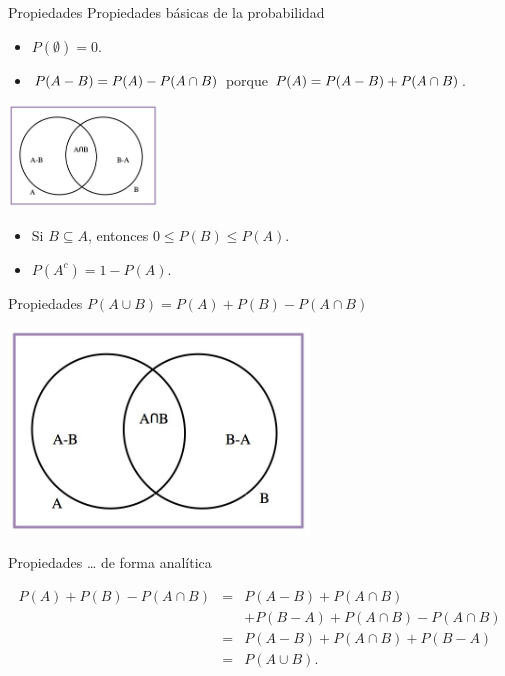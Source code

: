 \documentclass[
  ignorenonframetext,
  aspectratio=169]{beamer}
\begin{document}
\begin{frame}{Propiedades}
\label{propiedades-2}
Propiedades básicas de la probabilidad

\begin{itemize}
\item
  \(P(\emptyset)=0\).
\item
  \(\scriptsize{P(A-B)=P(A)-P(A\cap B)}\) porque
  \(\scriptsize{P(A)=P(A-B)+P(A\cap B)}\).
\end{itemize}

\begin{center}
\includegraphics[width=0.3\textwidth,height=\textheight]{Images/proba1dibujos/A-B.jpg}
\end{center}

\begin{itemize}
\item
  Si \(B\subseteq A\), entonces \(0\leq P(B)\leq P(A)\).
\item
  \(P(A^c)=1-P(A)\).
\end{itemize}
\end{frame}

\begin{frame}{Propiedades}
\label{propiedades-3}
\(P(A\cup B)=P(A)+P(B)-P(A\cap B)\)

\begin{center}
\includegraphics[width=0.6\textwidth,height=\textheight]{Images/proba1dibujos/A-B.jpg}
\end{center}
\end{frame}

\begin{frame}{Propiedades}
\label{propiedades-4}
\ldots{} de forma analítica

\begin{eqnarray*}
P(A)+P(B)-P(A\cap B) &=& P(A-B)+P(A\cap B)\\ 
& & +P(B-A)+ P(A\cap  B)-P(A\cap  B)\\
&=& P(A-B)+P(A\cap B)+ P(B-A) \\
&=& P(A\cup B).\\
\end{eqnarray*}
\end{frame}
\end{document}
